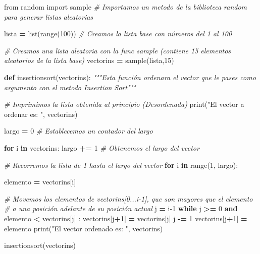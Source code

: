 \documentclass[
]{article}
\newenvironment{Shaded}{\begin{snugshade}}{\end{snugshade}}
\newcommand{\BuiltInTok}[1]{#1}
\newcommand{\CommentTok}[1]{\textcolor[rgb]{0.56,0.35,0.01}{\textit{#1}}}
\newcommand{\ControlFlowTok}[1]{\textcolor[rgb]{0.13,0.29,0.53}{\textbf{#1}}}
\newcommand{\DecValTok}[1]{\textcolor[rgb]{0.00,0.00,0.81}{#1}}
\newcommand{\ImportTok}[1]{#1}
\newcommand{\KeywordTok}[1]{\textcolor[rgb]{0.13,0.29,0.53}{\textbf{#1}}}
\newcommand{\NormalTok}[1]{#1}
\newcommand{\OperatorTok}[1]{\textcolor[rgb]{0.81,0.36,0.00}{\textbf{#1}}}
\newcommand{\StringTok}[1]{\textcolor[rgb]{0.31,0.60,0.02}{#1}}
\begin{document}
\begin{Shaded}
\begin{Highlighting}[]
\ImportTok{from}\NormalTok{ random }\ImportTok{import}\NormalTok{ sample }\CommentTok{# Importamos un metodo de la biblioteca random para generar listas aleatorias}

\NormalTok{lista }\OperatorTok{=} \BuiltInTok{list}\NormalTok{(}\BuiltInTok{range}\NormalTok{(}\DecValTok{100}\NormalTok{)) }\CommentTok{# Creamos la lista base con números del 1 al 100}

\CommentTok{# Creamos una lista aleatoria con la func sample (contiene 15 elementos aleatorios de la lista base)}
\NormalTok{vectorins }\OperatorTok{=}\NormalTok{ sample(lista,}\DecValTok{15}\NormalTok{)}

\KeywordTok{def}\NormalTok{ insertionsort(vectorins): }
    \CommentTok{"""Esta función ordenara el vector que le pases como argumento con el metodo Insertion Sort"""}
    
    \CommentTok{# Imprimimos la lista obtenida al principio (Desordenada)}
    \BuiltInTok{print}\NormalTok{(}\StringTok{"El vector a ordenar es: "}\NormalTok{, vectorins)}
    
\NormalTok{    largo }\OperatorTok{=} \DecValTok{0} \CommentTok{# Establecemos un contador del largo}
     
    \ControlFlowTok{for}\NormalTok{ i }\KeywordTok{in}\NormalTok{ vectorins:}
\NormalTok{        largo }\OperatorTok{+=} \DecValTok{1} \CommentTok{# Obtenemos el largo del vector}
    
    \CommentTok{# Recorremos la lista de 1 hasta el largo del vector}
    \ControlFlowTok{for}\NormalTok{ i }\KeywordTok{in} \BuiltInTok{range}\NormalTok{(}\DecValTok{1}\NormalTok{, largo): }
    
\NormalTok{        elemento }\OperatorTok{=}\NormalTok{ vectorins[i] }
  
        \CommentTok{# Movemos los elementos de vectorins[0...i-1], que son mayores que el elemento}
        \CommentTok{# a una posición adelante de su posición actual}
\NormalTok{        j }\OperatorTok{=}\NormalTok{ i}\DecValTok{-1}
        \ControlFlowTok{while}\NormalTok{ j }\OperatorTok{>=} \DecValTok{0} \KeywordTok{and}\NormalTok{ elemento }\OperatorTok{<}\NormalTok{ vectorins[j] : }
\NormalTok{                vectorins[j}\OperatorTok{+}\DecValTok{1}\NormalTok{] }\OperatorTok{=}\NormalTok{ vectorins[j] }
\NormalTok{                j }\OperatorTok{-=} \DecValTok{1}
\NormalTok{        vectorins[j}\OperatorTok{+}\DecValTok{1}\NormalTok{] }\OperatorTok{=}\NormalTok{ elemento }
    \BuiltInTok{print}\NormalTok{(}\StringTok{"El vector ordenado es: "}\NormalTok{, vectorins)}

\NormalTok{insertionsort(vectorins)}
\end{Highlighting}
\end{Shaded}
\end{document}
